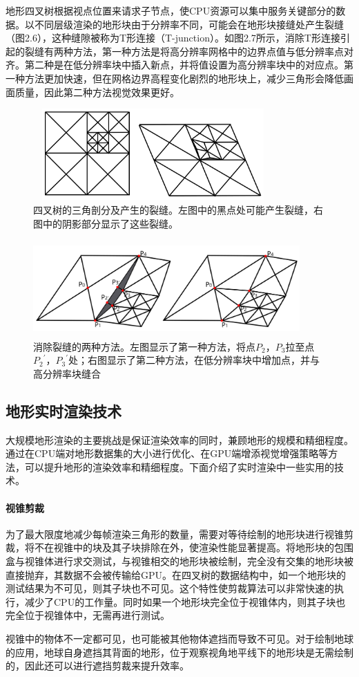 地形四叉树根据视点位置来请求子节点，使CPU资源可以集中服务关键部分的数据。以不同层级渲染的地形块由于分辨率不同，可能会在地形块接缝处产生裂缝（图2.6），这种缝隙被称为T形连接（T-junction）。如图2.7所示，消除T形连接引起的裂缝有两种方法，第一种方法是将高分辨率网格中的边界点值与低分辨率点对齐。第二种是在低分辨率块中插入新点，并将值设置为高分辨率块中的对应点。第一种方法更加快速，但在网格边界高程变化剧烈的地形块上，减少三角形会降低画面质量，因此第二种方法视觉效果更好。
\begin{figure}[H]
    \centering
    \includegraphics[height=3.5cm,width=9.2cm]{figures/seam2.jpg}
    \caption{四叉树的三角剖分及产生的裂缝。左图中的黑点处可能产生裂缝，右图中的阴影部分显示了这些裂缝。\supercite{You2003Real}}
\end{figure}
\begin{figure}[H]
    \centering
    \includegraphics[height=3.7cm,width=10.2cm]{figures/seamRepair.png}
    \caption{消除裂缝的两种方法。左图显示了第一种方法，将点$P_2$，$P_3$拉至点${P_2}^{'}$，${P_3}^{'}$处；右图显示了第二种方法，在低分辨率块中增加点，并与高分辨率块缝合\supercite{You2003Real}}
\end{figure}
\subsection{地形实时渲染技术}
大规模地形渲染的主要挑战是保证渲染效率的同时，兼顾地形的规模和精细程度。通过在CPU端对地形数据集的大小进行优化、在GPU端增添视觉增强策略等方法，可以提升地形的渲染效率和精细程度。下面介绍了实时渲染中一些实用的技术。
\paragraph{视锥剪裁}
为了最大限度地减少每帧渲染三角形的数量，需要对等待绘制的地形块进行视锥剪裁，将不在视锥中的块及其子块排除在外，使渲染性能显著提高。将地形块的包围盒与视锥体进行求交测试，与视锥相交的地形块被绘制，完全没有交集的地形块被直接抛弃，其数据不会被传输给GPU。在四叉树的数据结构中，如一个地形块的测试结果为不可见，则其子块也不可见。这个特性使剪裁算法可以非常快速的执行，减少了CPU的工作量。同时如果一个地形块完全位于视锥体内，则其子块也完全位于视锥体中，无需再进行测试。\par
视锥中的物体不一定都可见，也可能被其他物体遮挡而导致不可见。对于绘制地球的应用，地球自身遮挡其背面的地形，位于观察视角地平线下的地形块是无需绘制的，因此还可以进行遮挡剪裁来提升效率。


